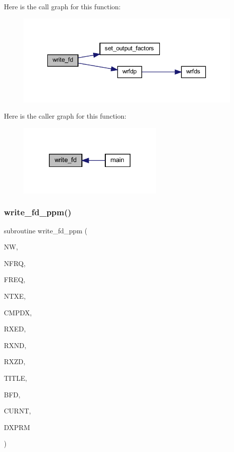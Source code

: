 Here is the call graph for this function\+:
\nopagebreak
\begin{figure}[H]
\begin{center}
\leavevmode
\includegraphics[width=340pt]{Marco_8f90_a369920397ca735b23d30254943dc7811_cgraph}
\end{center}
\end{figure}
Here is the caller graph for this function\+:
\nopagebreak
\begin{figure}[H]
\begin{center}
\leavevmode
\includegraphics[width=204pt]{Marco_8f90_a369920397ca735b23d30254943dc7811_icgraph}
\end{center}
\end{figure}
\mbox{\label{Marco_8f90_a6c5a9a67801add3eebe2342e6b8ce010}} 
\subsubsection{\texorpdfstring{write\+\_\+fd\+\_\+ppm()}{write\_fd\_ppm()}}
{\footnotesize\ttfamily subroutine write\+\_\+fd\+\_\+ppm (\begin{DoxyParamCaption}\item[{integer}]{NW,  }\item[{integer}]{N\+F\+RQ,  }\item[{real, dimension(nfrq)}]{F\+R\+EQ,  }\item[{integer}]{N\+T\+XE,  }\item[{integer}]{C\+M\+P\+DX,  }\item[{real(kind=8), dimension (1,ntxe,1)}]{R\+X\+ED,  }\item[{real(kind=8), dimension (1,ntxe,1)}]{R\+X\+ND,  }\item[{real(kind=8), dimension (1,ntxe,1)}]{R\+X\+ZD,  }\item[{character(len=120)}]{T\+I\+T\+LE,  }\item[{complex, dimension(nfrq,1,ntxe,3)}]{B\+FD,  }\item[{real, dimension(nfrq)}]{C\+U\+R\+NT,  }\item[{real, dimension(3,3)}]{D\+X\+P\+RM }\end{DoxyParamCaption})}

